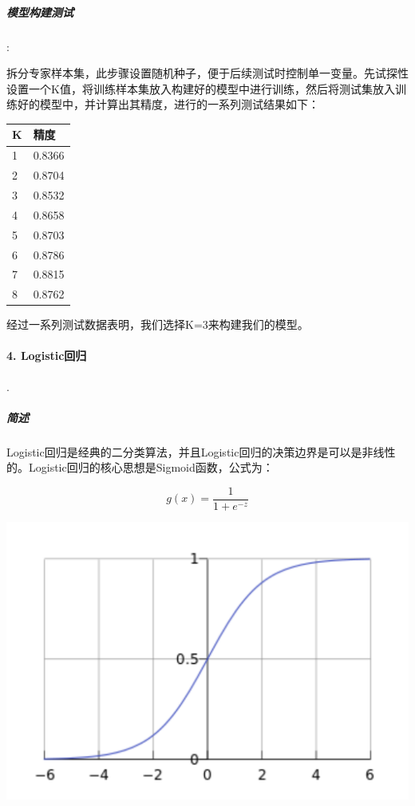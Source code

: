 \documentclass[lang=cn,12pt]{elegantpaper}
\begin{document}
\subparagraph{模型构建测试}:

拆分专家样本集，此步骤设置随机种子，便于后续测试时控制单一变量。先试探性设置一个K值，将训练样本集放入构建好的模型中进行训练，然后将测试集放入训练好的模型中，并计算出其精度，进行的一系列测试结果如下：

\begin{center}
		\begin{tabular}{|l|l|}
			\hline
			K & 精度     \\ \hline
			1 & 0.8366 \\ \hline
			2 & 0.8704 \\ \hline
			3 & 0.8532 \\ \hline
			4 & 0.8658 \\ \hline
			5 & 0.8703 \\ \hline
			6 & 0.8786 \\ \hline
			7 & 0.8815 \\ \hline
			8 & 0.8762 \\ \hline
		\end{tabular}
\end{center}

经过一系列测试数据表明，我们选择K=3来构建我们的模型。

\paragraph{4. Logistic回归}.

\subparagraph{简述}

Logistic回归\cite{基于集成学习的高送转股票研究}是经典的二分类算法，并且Logistic回归的决策边界是可以是非线性的。Logistic回归的核心思想是Sigmoid函数，公式为：

\begin{equation}
\nonumber g(x)=\frac{1}{1+e^{-z}}
\end{equation}

\begin{center}
	\includegraphics[width=0.6\columnwidth]{4.png}
\end{center}
\end{document}
